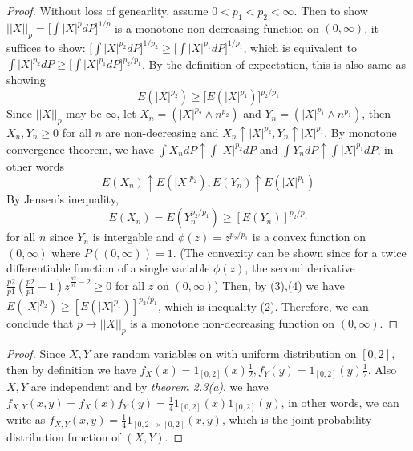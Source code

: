 \documentclass[10pt]{article}
\newenvironment{problem}[2][Problem]{\begin{trivlist}
\item[\hskip \labelsep {\bfseries #1}\hskip \labelsep {\bfseries #2.}]}{\end{trivlist}}
\begin{document}
\begin{proof}
Without loss of genearlity, assume $0 < p_{1} < p_{2} < \infty$. Then to show $||X||_{p} = \big[\int |X|^{p}dP\big]^{1/p}$ is a monotone non-decreasing function on $(0, \infty)$, it suffices to show: $\big[\int |X|^{p_{2}}dP\big]^{1/p_{2}} \ge \big[\int |X|^{p_{1}}dP\big]^{1/p_{1}}$, which is equivalent to $\int |X|^{p_{2}}dP \ge \big[\int |X|^{p_{1}}dP\big]^{p_{2}/p_{1}}$.
By the definition of expectation, this is also same as showing
\begin{equation}
E(|X|^{p_{2}}) \ge \big[E(|X|^{p_{1}})\big]^{p_{2}/p_{1}}
\end{equation}
Since $||X||_{p}$ may be $\infty$, let $X_{n} = (|X|^{p_{2}} \wedge n^{p_{2}})$ and $Y_{n} = (|X|^{p_{1}} \wedge n^{p_{1}})$, then $X_{n}, Y_{n} \ge 0$ for all $n$ are non-decreasing and $X_{n} \uparrow \big|X\big|^{p_{2}}, Y_{n} \uparrow \big|X\big|^{p_{1}}$.
By monotone convergence theorem, we have $\int X_{n}dP \uparrow \int |X|^{p_{2}}dP$ and $\int Y_{n}dP \uparrow \int |X|^{p_{1}}dP$, in other words 
\begin{equation}
E(X_{n})\uparrow E(|X|^{p_{2}}), E(Y_{n})\uparrow E(|X|^{p_{1}})
\end{equation}
By Jensen's inequality, 
\begin{equation}
E(X_{n}) = E(Y_{n}^{p_{2}/p_{1}}) \ge [E(Y_{n})]^{p_{2}/ p_{1}}
\end{equation}
for all $n$ since $Y_{n}$ is intergable and $\phi(z) = z^{p_{2}/ p_{1}}$ is a convex function on $(0,\infty)$ where $P((0,\infty)) = 1$. (The convexity can be shown since for a twice differentiable function of a single variable $\phi(z)$, the second derivative $\frac{p2}{p1}(\frac{p2}{p1}-1)z^{\frac{p2}{p1} - 2} \ge 0$ for all $z$ on $(0,\infty)$)
Then, by (3),(4) we have $E(|X|^{p_{2}}) \ge [E(|X|^{p_{1}})]^{p_{2}/ p_{1}}$, which is inequality (2). Therefore, we can conclude that $p\rightarrow ||X||_{p}$ is a monotone non-decreasing function on $(0, \infty)$.
\end{proof}

\begin{problem}{5(a)}
\end{problem}
 
\begin{proof}
Since $X, Y$ are random variables on with uniform distribution on $[0,2]$, then by definition we have $f_{X}(x) = 1_{[0,2]}(x)\frac{1}{2}, f_{Y}(y) = 1_{[0,2]}(y)\frac{1}{2}$. Also $X, Y$ are independent and by \textit{theorem 2.3(a)}, we have $f_{X,Y}(x,y) = f_{X}(x)f_{Y}(y) = \frac{1}{4}1_{[0,2]}(x)1_{[0,2]}(y)$, in other words, we can write as $f_{X,Y}(x,y) = \frac{1}{4}1_{[0,2]\times[0,2]}(x,y)$, which is the joint probability distribution function of $(X,Y)$.
\end{proof}
\end{document}
